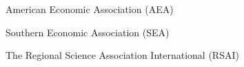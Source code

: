 {American Economic Association (AEA)}
{}

{Southern Economic Association (SEA)}
{}

{The Regional Science Association International (RSAI)}
{}